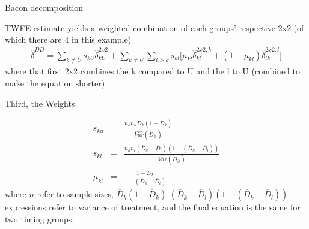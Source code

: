 \documentclass{beamer}
\begin{document}
	

\begin{frame}{Bacon decomposition}


TWFE estimate yields a weighted combination of each groups' respective 2x2 (of which there are 4 in this example)
\begin{eqnarray*}	
\widehat{\delta}^{DD} = \sum_{k \neq U} s_{kU}\widehat{\delta}_{kU}^{2x2} + \sum_{k \neq U} \sum_{l>k} s_{kl}  \bigg [ \mu_{kl}\widehat{\delta}_{kl}^{2x2,k} + (1-\mu_{kl}) \widehat{\delta}_{lk}^{2x2,l} \bigg]
\end{eqnarray*}where that first 2x2 combines the k compared to U and the l to U (combined to make the equation shorter)

\end{frame}
	


\begin{frame}{Third, the Weights}

 \begin{eqnarray*} s_{ku} &=& \frac{ n_k n_u \overline{D}_k (1- \overline{D}_k ) }{ \widehat{Var} ( \tilde{D}_{it} )} \\
s_{kl} &=& \frac{ n_k n_l (\overline{D}_k - \overline{D}_{l} ) ( 1- ( \overline{D}_k - \overline{D}_{l} )) }{\widehat{Var}(\tilde{D}_{it})} \\
\mu_{kl} &=& \frac{1 - \overline{D}_k }{1 - ( \overline{D}_k - \overline{D}_{l} )}
\end{eqnarray*}where $n$ refer to sample sizes, $\overline{D}_k (1- \overline{D}_k )$ $(\overline{D}_k - \overline{D}_{l} ) ( 1- ( \overline{D}_k - \overline{D}_{l} ))$ expressions refer to variance of treatment, and the final equation is the same for two timing groups.

\end{frame}
\end{document}
